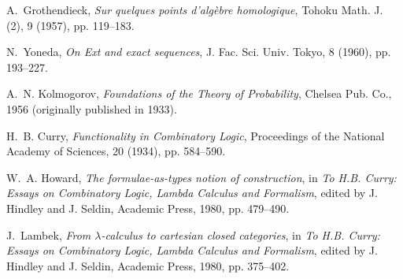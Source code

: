 \documentclass[12pt]{article}
\begin{document}
\vspace{1em}

\begin{thebibliography}{9}

A.~Grothendieck, \emph{Sur quelques points d'alg\`ebre homologique}, Tohoku Math. J. (2), 9 (1957), pp. 119--183.

N.~Yoneda, \emph{On Ext and exact sequences}, J. Fac. Sci. Univ. Tokyo, 8 (1960), pp. 193--227.

A.~N. Kolmogorov, \emph{Foundations of the Theory of Probability}, Chelsea Pub. Co., 1956 (originally published in 1933).

H.~B. Curry, \emph{Functionality in Combinatory Logic}, Proceedings of the National Academy of Sciences, 20 (1934), pp. 584--590.

W.~A. Howard, \emph{The formulae-as-types notion of construction}, in \emph{To H.B. Curry: Essays on Combinatory Logic, Lambda Calculus and Formalism}, edited by J. Hindley and J. Seldin, Academic Press, 1980, pp. 479--490.

J.~Lambek, \emph{From $\lambda$-calculus to cartesian closed categories}, in \emph{To H.B. Curry: Essays on Combinatory Logic, Lambda Calculus and Formalism}, edited by J. Hindley and J. Seldin, Academic Press, 1980, pp. 375--402.

\end{thebibliography}
\end{document}
